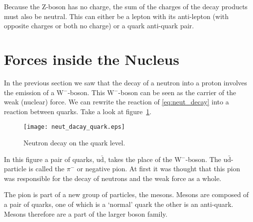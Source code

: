 Because the Z-boson has no charge, the sum of the charges of the decay products must also be neutral. This can either be a lepton with its anti-lepton (with opposite charges or both no charge) or a quark anti-quark pair.

\section{Forces inside the Nucleus}
In the previous section we saw that the decay of a neutron into a proton involves the emission of a W$^-$-boson. This W$^-$-boson can be seen as the carrier of the weak (nuclear) force. We can rewrite the reaction of \ref{eq:neut_decay} into a reaction between quarks. Take a look at figure~\ref{fig:neut_dacay_quark}.

\begin{figure}\begin{center}
\texttt{[image: neut\_dacay\_quark.eps]}%
\caption{Neutron decay on the quark level.}\label{fig:neut_dacay_quark}
\end{center}\end{figure}

In this figure a pair of quarks, u$\bar{\mbox{d}}$, takes the place of the W$^-$-boson. The u$\bar{\mbox{d}}$-particle is called the $\pi^-$ or negative pion. At first it was thought that this pion was responsible for the decay of neutrons and the weak force as a whole.

The pion is part of a new group of particles, the mesons. Mesons are composed of a pair of quarks, one of which is a `normal' quark the other is an anti-quark. Mesons therefore are a part of the larger boson family.

